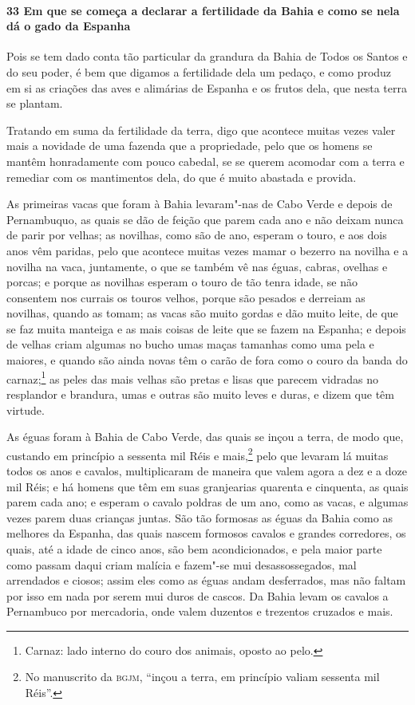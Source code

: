 \begin{linenumbers}
\paragraph{33 Em que se começa a declarar a fertilidade da Bahia e como se nela dá o gado
da Espanha}\quad
Pois se tem dado conta tão particular da grandura da Bahia de Todos os Santos e do seu
poder, é bem que digamos a fertilidade dela um pedaço, e como produz em si as criações das
aves e alimárias de Espanha e os frutos dela, que nesta terra se plantam.

Tratando em suma da fertilidade da terra, digo que acontece muitas vezes valer mais a
novidade de uma fazenda que a propriedade, pelo que os homens se mantêm honradamente com
pouco cabedal, se se querem acomodar com a terra e remediar com os mantimentos dela, do
que é muito abastada e provida.

As primeiras vacas que foram à Bahia levaram"-nas de Cabo Verde e depois de Pernambuquo, as
quais se dão de feição que parem cada ano e não deixam nunca de parir por velhas; as
novilhas, como são de ano, esperam o touro, e aos dois anos vêm paridas, pelo que acontece
muitas vezes mamar o bezerro na novilha e a novilha na vaca, juntamente, o que se também
vê nas éguas, cabras, ovelhas e porcas; e porque as novilhas esperam o touro de tão tenra
idade, se não consentem nos currais os touros velhos, porque são pesados e derreiam as
novilhas, quando as tomam; as vacas são muito gordas e dão muito leite, de que se faz
muita manteiga e as mais coisas de leite que se fazem na Espanha; e depois de velhas criam
algumas no bucho umas maças tamanhas como uma pela e maiores, e quando são ainda novas têm
o carão de fora como o couro da banda do carnaz;\footnote{ Carnaz: lado interno do couro
dos animais, oposto ao pelo.} as peles das mais velhas são pretas e lisas que parecem
vidradas no resplandor e brandura, umas e outras são muito leves e duras, e dizem que têm
virtude.

As éguas foram à Bahia de Cabo Verde, das quais se inçou a terra, de modo que, custando em
princípio a sessenta mil Réis e mais,\footnote{ No manuscrito da \textsc{bgjm}, ``inçou a
terra, em princípio valiam sessenta mil Réis''.} pelo que levaram lá muitas todos os anos
e cavalos, multiplicaram de maneira que valem agora a dez e a doze mil Réis; e há homens
que têm em suas granjearias quarenta e cinquenta, as quais parem cada ano; e esperam o
cavalo poldras de um ano, como as vacas, e algumas vezes parem duas crianças juntas. São
tão formosas as éguas da Bahia como as melhores da Espanha, das quais nascem formosos
cavalos e grandes corredores, os quais, até a idade de cinco anos, são bem acondicionados,
e pela maior parte como passam daqui criam malícia e fazem"-se mui desassossegados, mal
arrendados e ciosos; assim eles como as éguas andam desferrados, mas não faltam por isso
em nada por serem mui duros de cascos. Da Bahia levam os cavalos a Pernambuco por
mercadoria, onde valem duzentos e trezentos cruzados e mais.


\end{linenumbers}
